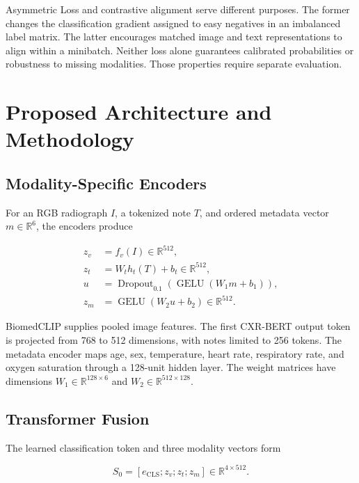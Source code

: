 \documentclass[pdflatex,sn-mathphys-num]{sn-jnl}
\begin{document}
Asymmetric Loss and contrastive alignment serve different purposes. The former changes the classification gradient assigned to easy negatives in an imbalanced label matrix. The latter encourages matched image and text representations to align within a minibatch. Neither loss alone guarantees calibrated probabilities or robustness to missing modalities. Those properties require separate evaluation.

\section{Proposed Architecture and Methodology}

\subsection{Modality-Specific Encoders}

For an RGB radiograph $I$, a tokenized note $T$, and ordered metadata vector $m\in\mathbb{R}^{6}$, the encoders produce

\begin{align}
z_v &= f_v(I)\in\mathbb{R}^{512},
\label{eq:vision}\\
z_t &= W_t h_t(T)+b_t\in\mathbb{R}^{512},
\label{eq:text}\\
u &= \operatorname{Dropout}_{0.1}
(\operatorname{GELU}(W_1m+b_1)),
\label{eq:meta1}\\
z_m &= \operatorname{GELU}(W_2u+b_2)
\in\mathbb{R}^{512}.
\label{eq:meta2}
\end{align}

BiomedCLIP supplies pooled image features. The first CXR-BERT output token is projected from 768 to 512 dimensions, with notes limited to 256 tokens. The metadata encoder maps age, sex, temperature, heart rate, respiratory rate, and oxygen saturation through a 128-unit hidden layer. The weight matrices have dimensions $W_1\in\mathbb{R}^{128\times6}$ and $W_2\in\mathbb{R}^{512\times128}$.

\subsection{Transformer Fusion}

The learned classification token and three modality vectors form

\begin{equation}
S_0=[e_{\mathrm{CLS}};z_v;z_t;z_m]
\in\mathbb{R}^{4\times512}.
\end{equation}
\end{document}
